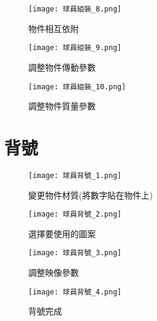 \begin{figure}[h]
  \begin{center}
    \texttt{[image: 球員組裝\_8.png]}
  \end{center}
  \caption{物件相互依附}
  \label{fig:photo}
\end{figure}
\begin{figure}[h]
  \begin{center}
    \texttt{[image: 球員組裝\_9.png]}
  \end{center}
  \caption{調整物件傳動參數}
  \label{fig:photo}
\end{figure}
\begin{figure}[h]
  \begin{center}
    \texttt{[image: 球員組裝\_10.png]}
  \end{center}
  \caption{調整物件質量參數}
  \label{fig:photo}
\end{figure}
\newpage

\section{背號}
\begin{figure}[h]
  \begin{center}
    \texttt{[image: 球員背號\_1.png]}
  \end{center}
  \caption{變更物件材質(將數字貼在物件上)}
  \label{fig:photo}
\end{figure}
\begin{figure}[h]
  \begin{center}
    \texttt{[image: 球員背號\_2.png]}
  \end{center}
  \caption{選擇要使用的圖案}
  \label{fig:photo}
\end{figure}
\begin{figure}[h]
  \begin{center}
    \texttt{[image: 球員背號\_3.png]}
  \end{center}
  \caption{調整映像參數}
  \label{fig:photo}
\end{figure}
\begin{figure}[h]
  \begin{center}
    \texttt{[image: 球員背號\_4.png]}
  \end{center}
  \caption{背號完成}
  \label{fig:photo}
\end{figure}
\newpage

